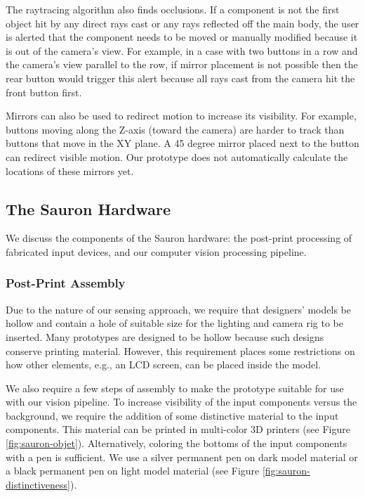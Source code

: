 The raytracing algorithm also finds occlusions. If a component %
is not the first object hit by any direct rays cast or any rays reflected off the main body, the user is alerted that the component needs to be moved or manually modified because it is out of the camera's view. For example, in a case with two buttons in a row and the camera's view parallel to the row, if mirror placement is not possible then the rear button would trigger this alert because all rays cast from the camera hit the front button first.

Mirrors can also be used to redirect motion to increase its visibility. For example, buttons moving along the Z-axis (toward the camera) are harder to track than buttons that move in the XY plane. A 45 degree mirror placed next to the button can redirect visible motion. Our prototype does not automatically calculate the locations of these mirrors yet.

    \subsection{The Sauron Hardware}
    
    We discuss the components of the Sauron hardware: the post-print processing of fabricated input devices, and our computer vision processing pipeline.

\subsubsection{Post-Print Assembly}
Due to the nature of our sensing approach, we require that designers' models be hollow and contain a hole of suitable size for the lighting and camera rig to be inserted. Many prototypes are designed to be hollow because such designs conserve printing material. However, this requirement places some restrictions on how other elements, e.g., an LCD screen, can be placed inside the model. 

We also require a few steps of assembly to make the prototype suitable for use with our vision pipeline.
To increase visibility of the input components versus the background, we require the addition of some distinctive material to the input components. This material can be printed in multi-color 3D printers (see Figure \ref{fig:sauron-objet}). Alternatively, coloring the bottoms of the input components with a pen is sufficient. We use a silver permanent pen on dark model material or a black permanent pen on light model material (see Figure \ref{fig:sauron-distinctiveness}).

